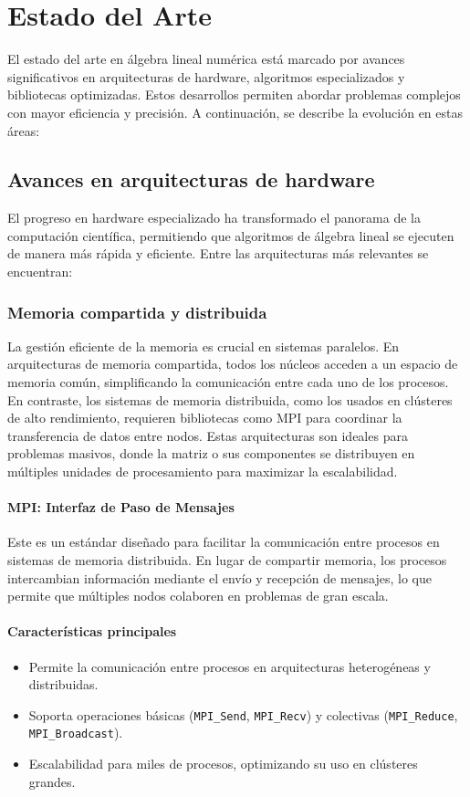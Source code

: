 \documentclass{article}
\begin{document}
\section{Estado del Arte}

El estado del arte en álgebra lineal numérica está marcado por avances significativos en arquitecturas de hardware, algoritmos especializados y bibliotecas optimizadas. Estos desarrollos permiten abordar problemas complejos con mayor eficiencia y precisión. A continuación, se describe la evolución en estas áreas:

\subsection{Avances en arquitecturas de hardware}
El progreso en hardware especializado ha transformado el panorama de la computación científica, permitiendo que algoritmos de álgebra lineal se ejecuten de manera más rápida y eficiente. Entre las arquitecturas más relevantes se encuentran:

\subsubsection{Memoria compartida y distribuida}
La gestión eficiente de la memoria es crucial en sistemas paralelos. En arquitecturas de memoria compartida, todos los núcleos acceden a un espacio de memoria común, simplificando la comunicación entre cada uno de los procesos. En contraste, los sistemas de memoria distribuida, como los usados en clústeres de alto rendimiento, requieren bibliotecas como MPI para coordinar la transferencia de datos entre nodos. Estas arquitecturas son ideales para problemas masivos, donde la matriz o sus componentes se distribuyen en múltiples unidades de procesamiento para maximizar la escalabilidad.

\paragraph{MPI: Interfaz de Paso de Mensajes}

Este es un estándar diseñado para facilitar la comunicación entre procesos en sistemas de memoria distribuida. En lugar de compartir memoria, los procesos intercambian información mediante el envío y recepción de mensajes, lo que permite que múltiples nodos colaboren en problemas de gran escala.

\paragraph{Características principales}
\begin{itemize}
    \item Permite la comunicación entre procesos en arquitecturas heterogéneas y distribuidas.
    \item Soporta operaciones básicas (\texttt{MPI\_Send}, \texttt{MPI\_Recv}) y colectivas (\texttt{MPI\_Reduce}, \texttt{MPI\_Broadcast}).
    \item Escalabilidad para miles de procesos, optimizando su uso en clústeres grandes.
\end{itemize}
\end{document}
